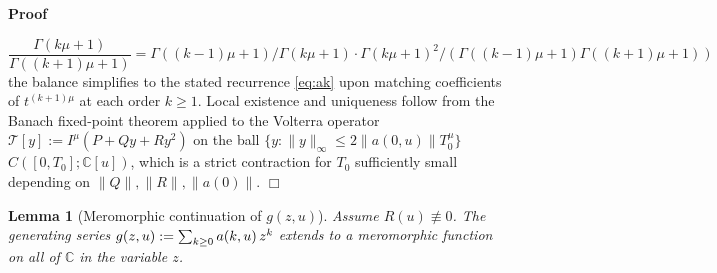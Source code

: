 \documentclass{article}
\newcommand{\assign}{:=}
\newcommand{\nequiv}{\mathrel{\not\equiv}}
\newenvironment{proof}{\noindent\textbf{Proof\ }}{\hspace*{\fill}$\Box$\medskip}
\newtheorem{lemma}{Lemma}
\newcommand{\C}{\mathbb{C}}
\begin{document}
\begin{proof}
  
  \begin{equation}
    \frac{\Gamma (k \mu + 1)}{\Gamma ((k + 1) \mu + 1)} = \Gamma ((k - 1) \mu
    + 1) / \Gamma (k \mu + 1) \cdot \Gamma (k \mu + 1)^2 / (\Gamma ((k - 1)
    \mu + 1) \Gamma ((k + 1) \mu + 1))
  \end{equation}
  the balance simplifies to the stated recurrence \eqref{eq:ak} upon matching
  coefficients of $t^{(k + 1) \mu}$ at each order $k \ge 1$. Local existence
  and uniqueness follow from the Banach fixed-point theorem applied to the
  Volterra operator $\mathcal{T} [y] \assign I^{\mu}  (P + Qy + Ry^2)$ on the
  ball $\{y : \|y\|_{\infty} \le 2\|a (0, u)\|T_0^{\mu} \}${\in}$C ([0, T_0] ;
  \C [u])$, which is a strict contraction for $T_0$ sufficiently small
  depending on $\|Q\|, \|R\|, \|a (0)\|$.
\end{proof}

\begin{lemma}
  [Meromorphic continuation of $g (z, u)$]\label{lem:meromorphic}Assume $R (u)
  \nequiv 0$. The generating series $g (z, u) \assign \sum_{k \ge 0} a (k, u) 
  \hspace{0.17em} z^k$ extends to a meromorphic function on all of $\C$ in the
  variable $z$.
\end{lemma}
\end{document}

